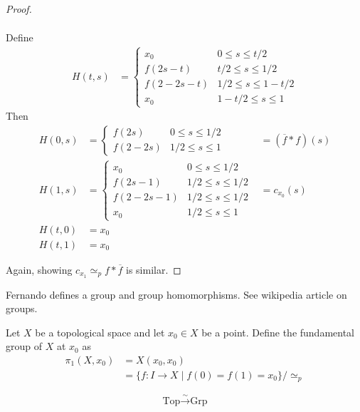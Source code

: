 \begin{proof}
\begin{enumerate}
\begin{align}
      \end{align}
      Define
      \begin{align}
        H(t, s) &= \begin{cases}
          x_0 & 0 \le s \le t/2 \\
          f(2s - t) & t/2 \le s \le 1/2 \\
          f(2 - 2s - t) & 1/2 \le s \le 1 - t/2 \\
          x_0 & 1 - t/2 \le s \le 1
        \end{cases}
      \end{align}
      Then
      \begin{align}
        H(0, s) &= \begin{cases}
          f(2s) & 0 \le s \le 1/2 \\
          f(2 - 2s) & 1/2 \le s \le 1
        \end{cases} &= (\overline{f} * f)(s) \\
        H(1, s) &= \begin{cases}
          x_0 & 0 \le s \le 1/2 \\
          f(2s - 1) & 1/2 \le s \le 1/2 \\
          f(2 - 2s - 1) & 1/2 \le s \le 1/2 \\
          x_0 & 1/2 \le s \le 1
        \end{cases} &= c_{x_0}(s) \\
        H(t, 0) &= x_0 \\
        H(t, 1) &= x_0
      \end{align}
  \end{enumerate}
  Again, showing \( c_{x_1} \simeq_p f * \overline{f} \)
  is similar.
\end{proof}

Fernando defines a group and group homomorphisms.
See wikipedia article on groups.

\begin{definition}
   Let \( X \) be a topological space and
   let \( x_0 \in X \) be a point.
   Define the fundamental group of \( X \) at \( x_0 \)
   as
   \begin{align*}
     \pi_1(X, x_0) &= X(x_0, x_0) \\
                   &= \{ f: I \to X \mid f(0) = f(1) = x_0 \} / \simeq_p
   \end{align*}
\end{definition}

\[
  \text{Top} \xrightarrow{\sim} \text{Grp}
\]

